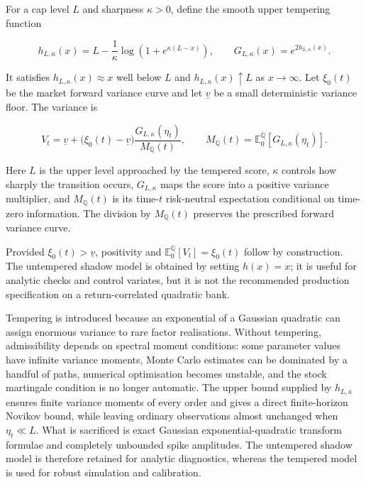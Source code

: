 \documentclass[11pt,a4paper]{article}
\newcommand{\Qq}{\mathbb{Q}}
\newcommand{\E}{\mathbb{E}}
\begin{document}
For a cap level \(L\) and sharpness \(\kappa>0\), define the smooth upper tempering function

\begin{equation}
h_{L,\kappa}(x)
=L-\frac{1}{\kappa}\log\!\left(1+e^{\kappa(L-x)}\right),
\qquad
G_{L,\kappa}(x)=e^{2h_{L,\kappa}(x)}.
\label{eq:cap}
\end{equation}

It satisfies \(h_{L,\kappa}(x)\approx x\) well below \(L\) and
\(h_{L,\kappa}(x)\uparrow L\) as \(x\to\infty\). Let \(\xi_0(t)\) be the market forward
variance curve and let \(\underline v\) be a small deterministic variance floor. The variance
is

\begin{equation}
\boxed{
V_t
=\underline v
+\bigl(\xi_0(t)-\underline v\bigr)
\frac{G_{L,\kappa}(\eta_t)}{M_{\Qq}(t)},
\qquad
M_{\Qq}(t)=\E_0^{\Qq}\!\left[G_{L,\kappa}(\eta_t)\right].}
\label{eq:variance}
\end{equation}

Here \(L\) is the upper level approached by the tempered score, \(\kappa\) controls how sharply
the transition occurs, \(G_{L,\kappa}\) maps the score into a positive variance multiplier,
and \(M_{\Qq}(t)\) is its time-\(t\) risk-neutral expectation conditional on time-zero
information. The division by \(M_{\Qq}(t)\) preserves the prescribed forward variance curve.

Provided \(\xi_0(t)>\underline v\), positivity and
\(\E_0^{\Qq}[V_t]=\xi_0(t)\) follow by construction. The untempered shadow model is obtained by
setting \(h(x)=x\); it is useful for analytic checks and control variates, but it is not the
recommended production specification on a return-correlated quadratic bank.

Tempering is introduced because an exponential of a Gaussian quadratic can assign enormous
variance to rare factor realisations. Without tempering, admissibility depends on spectral
moment conditions: some parameter values have infinite variance moments, Monte Carlo estimates
can be dominated by a handful of paths, numerical optimisation becomes unstable, and the stock
martingale condition is no longer automatic. The upper bound supplied by \(h_{L,\kappa}\)
ensures finite variance moments of every order and gives a direct finite-horizon Novikov bound,
while leaving ordinary observations almost unchanged when \(\eta_t\ll L\). What is sacrificed
is exact Gaussian exponential-quadratic transform formulae and completely unbounded spike
amplitudes. The untempered shadow model is therefore retained for analytic diagnostics, whereas
the tempered model is used for robust simulation and calibration.
\end{document}
